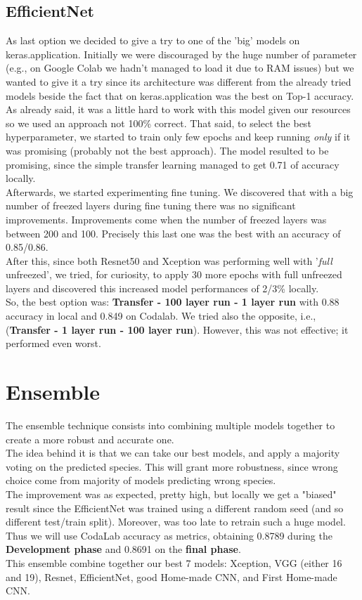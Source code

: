 \documentclass[11pt]{article}
\begin{document}
\subsection{EfficientNet}
As last option we decided to give a try to one of the 'big' models on keras.application.
Initially we were discouraged by the huge number of parameter (e.g., on Google Colab we hadn't managed to load it due to RAM issues) but we wanted to give it a try since its architecture was different from the already tried models beside the fact that on keras.application was the best on Top-1 accuracy.\\[0.1cm]
As already said, it was a little hard to work with this model given our resources so we used an approach not 100\% correct. That said, to select the best hyperparameter, we started to train only few epochs and keep running \textit{only} if it was promising (probably not the best approach). The model resulted to be promising, since the simple transfer learning managed to get 0.71 of accuracy locally. \\[0.1cm]
Afterwards, we started experimenting fine tuning. We discovered that with a big number of freezed layers during fine tuning there was no significant improvements. Improvements come when the number of freezed layers was between 200 and 100. Precisely this last one was the best with an accuracy of 0.85/0.86.\\[0.1cm]
After this, since both Resnet50 and Xception was performing well with '\textit{full} unfreezed', we tried, for curiosity, to apply 30 more epochs with full unfreezed layers and discovered this increased model performances of 2/3\% locally.\\[0.1cm]
So, the best option was: \textbf{Transfer - 100 layer run - 1 layer run} with 0.88 accuracy in local and 0.849 on Codalab. We tried also the opposite, i.e., (\textbf{Transfer - 1 layer run - 100 layer run}). However, this was not effective; it performed even worst.



\section{Ensemble}
The ensemble technique consists into combining multiple models together to create a more robust and accurate one. \\[0.1cm]
The idea behind it is that we can take our best models, and apply a majority voting on the predicted species. This will grant more robustness, since wrong choice come from majority of models predicting wrong species.\\[0.1cm]
The improvement was as expected, pretty high, but locally we get a "biased" result since the EfficientNet was trained using a different random seed (and so different test/train split). Moreover, was too late to retrain such a huge model. Thus we will use CodaLab accuracy as metrics, obtaining 0.8789 during the \textbf{Development phase} and 0.8691 on the \textbf{final phase}.\\[0.1cm]
This ensemble combine together our best 7 models: Xception, VGG (either 16 and 19), Resnet, EfficientNet, good Home-made CNN, and First Home-made CNN.
\end{document}
